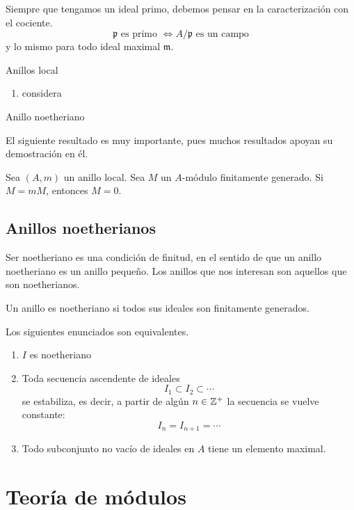 \documentclass[b5paper,10pt]{book}
\begin{document}
Siempre que tengamos un ideal primo,
debemos pensar en la caracterización con el cociente.
\[
	\mathfrak{p}\text{ es primo } \iff A/\mathfrak{p} \text{ es un campo}
\]
y lo mismo para todo ideal maximal \(\mathfrak{m}\).


Anillos local


\begin{ej}
\begin{enumerate}[label=(i)]
	\item considera
\end{enumerate}
\end{ej}
Anillo noetheriano

El siguiente resultado es muy importante,
pues muchos resultados apoyan su demostración en él.

\begin{thm}
Sea \((A,m)\) un anillo local.
Sea \(M\) un \(A\)-módulo finitamente generado.
Si \(M=mM\), entonces \(M=0\).
\end{thm}

\section{Anillos noetherianos}

Ser noetheriano es una condición de finitud,
en el sentido de que un anillo noetheriano
es un anillo pequeño.
Los anillos que nos interesan son aquellos 
que son noetherianos.

\begin{defi}
Un anillo es noetheriano si todos sus ideales
son finitamente generados.
\end{defi}

\begin{thm}
Los siguientes enunciados son equivalentes.
\begin{enumerate}[label=(\roman*)]
\item \(I\) es noetheriano
\item Toda secuencia ascendente de ideales 
	\[
	I_1\subset I_2\subset \cdots
	\]
	se estabiliza, es decir, a partir de algún 
	\(n\in \mathbb{Z}^+\) la secuencia se vuelve constante:
	\[
	I_n = I_{n+1} = \cdots
	\]
\item Todo subconjunto no vacío de ideales en \(A\) tiene un elemento maximal.
\end{enumerate}
\end{thm}


\chapter{Teoría de módulos}
\end{document}
